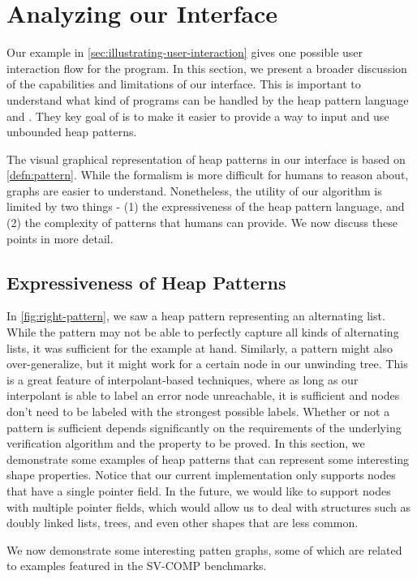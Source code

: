 \section{Analyzing our Interface}
Our example in \autoref{sec:illustrating-user-interaction} gives one possible user
interaction flow for the \altlistsimplified program. In this section, we present a
broader discussion of the capabilities and limitations of our interface. This is
important to understand what kind of programs can be handled by the heap pattern
language and \verifier. They key goal of \verifier is to make it easier to provide a way
to input and use unbounded heap patterns.

The visual graphical representation of heap patterns in our interface is based on
\autoref{defn:pattern}. While the formalism is more difficult for humans to reason
about, graphs are easier to understand. Nonetheless, the utility of our algorithm is
limited by two things - (1) the expressiveness of the heap pattern language, and (2) the
complexity of patterns that humans can provide. We now discuss these points in more
detail.

\subsection{Expressiveness of Heap Patterns}
\label{sec:expressiveness-of-heap-patterns}
In \autoref{fig:right-pattern}, we saw a heap pattern representing an alternating list.
While the pattern may not be able to perfectly capture all kinds of alternating lists,
it was sufficient for the example at hand. Similarly, a pattern might also
over-generalize, but it might work for a certain node in our unwinding tree. This is a
great feature of interpolant-based techniques, where as long as our interpolant is able
to label an error node unreachable, it is sufficient and nodes don't need to be labeled
with the strongest possible labels. Whether or not a pattern is sufficient depends
significantly on the requirements of the underlying verification algorithm and the
property to be proved. In this section, we demonstrate some examples of heap patterns
that can represent some interesting shape properties. Notice that our current
implementation only supports nodes that have a single pointer field. In the future, we
would like to support nodes with multiple pointer fields, which would allow us to deal
with structures such as doubly linked lists, trees, and even other shapes that are less
common.

We now demonstrate some interesting patten graphs, some of which are related to examples
featured in the SV-COMP \cite{sv-comp} benchmarks.

